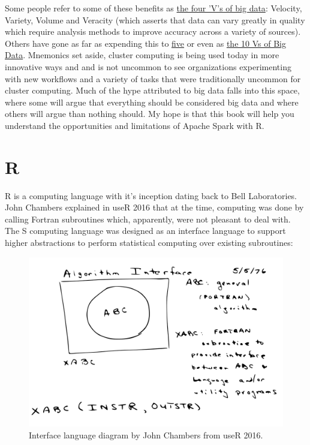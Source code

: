 \documentclass[]{book}
\theoremstyle{definition}
\theoremstyle{definition}
\theoremstyle{definition}
\theoremstyle{remark}
\begin{document}
Some people refer to some of these benefits as
\href{http://www.theserverside.com/feature/Handling-the-four-Vs-of-big-data-volume-velocity-variety-and-veracity}{the
four 'V's of big data}: Velocity, Variety, Volume and Veracity (which
asserts that data can vary greatly in quality which require analysis
methods to improve accuracy across a variety of sources). Others have
gone as far as expending this to
\href{https://en.wikipedia.org/wiki/Big_data}{five} or even as
\href{https://tdwi.org/articles/2017/02/08/10-vs-of-big-data.aspx}{the
10 Vs of Big Data}. Mnemonics set aside, cluster computing is being used
today in more innovative ways and and is not uncommon to see
organizations experimenting with new workflows and a variety of tasks
that were traditionally uncommon for cluster computing. Much of the hype
attributed to big data falls into this space, where some will argue that
everything should be considered big data and where others will argue
than nothing should. My hope is that this book will help you understand
the opportunities and limitations of Apache Spark with R.

\hypertarget{r}{%
\section{R}\label{r}}

R is a computing language with it's inception dating back to Bell
Laboratories. John Chambers explained in useR 2016 that at the time,
computing was done by calling Fortran subroutines which, apparently,
were not pleasant to deal with. The S computing language was designed as
an interface language to support higher abstractions to perform
statistical computing over existing subroutines:

\begin{figure}

{\centering \includegraphics[width=22.22in]{images/01-intro-s-algorithm-interface} 

}

\caption{Interface language diagram by John Chambers from useR 2016.}\label{fig:s-diagram}
\end{figure}
\end{document}
